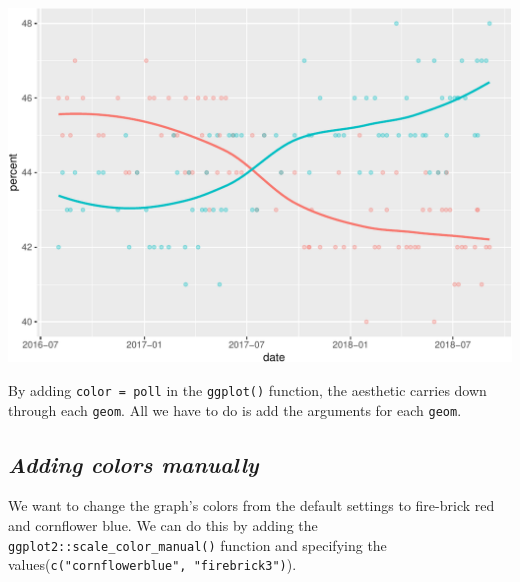 \documentclass[letterpaper,12pt,twoside,]{pinp}
\begin{document}
\begin{center}\includegraphics{03-intro-to-ggplot2_files/figure-latex/ggp_brexit_global-1} \end{center}

By adding \texttt{color\ =\ poll} in the \texttt{ggplot()} function, the
aesthetic carries down through each \texttt{geom}. All we have to do is
add the arguments for each \texttt{geom}.

\hypertarget{adding-colors-manually}{%
\subsection{\texorpdfstring{\textbf{\emph{Adding colors
manually}}}{Adding colors manually}}\label{adding-colors-manually}}

We want to change the graph's colors from the default settings to
fire-brick red and cornflower blue. We can do this by adding the
\texttt{ggplot2::scale\_color\_manual()} function and specifying the
values(\texttt{c("cornflowerblue",\ "firebrick3")}).

\begin{Shaded}
\begin{Highlighting}[]
\OtherTok{\textless{}{-}}\SpecialCharTok{+}  
  \NormalTok{(} \NormalTok{(}\NormalTok{, }\NormalTok{))}
\end{Highlighting}
\end{Shaded}
\end{document}
